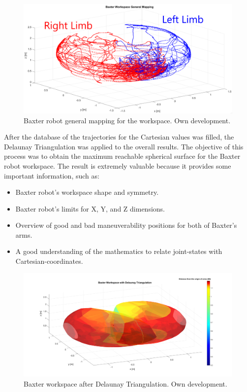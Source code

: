\documentclass[11pt]{report} %
\begin{document}
\begin{figure}[H]
    \centering
    \includegraphics[width=0.92\linewidth]{assets/imgs/baxter_robot/baxter_workspace_general_mapping.png}
    \caption{Baxter robot general mapping for the workspace. Own development.} 
    \label{fig_baxter_general_workspace}
\end{figure}

After the database of the trajectories for the Cartesian values was filled, the Delaunay Triangulation was applied to the overall results. The objective of this process was to obtain the maximum reachable spherical surface for the Baxter robot workspace. The result is extremely valuable because it provides some important information, such as:

\begin{itemize}
    \item Baxter robot's workspace shape and symmetry.
    \item Baxter robot's limits for X, Y, and Z dimensions.
    \item Overview of good and bad maneuverability positions for both of Baxter's arms.
    \item A good understanding of the mathematics to relate joint-states with Cartesian-coordinates.
\end{itemize}


\begin{figure}[H]
    \centering
    \includegraphics[width=1.0\linewidth]{assets/imgs/baxter_robot/baxter_workspace_delaunay_triangulation.png}
    \caption{Baxter workspace after Delaunay Triangulation. Own development.} 
    \label{fig_workspace_after_delaunay_triangulation}
\end{figure}
\end{document}
